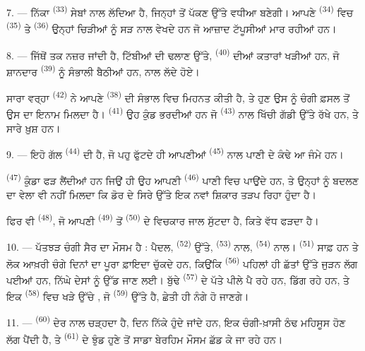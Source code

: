 7. --- ਨਿੱਕਾ  \textsuperscript{(33)} ਸੇਬਾਂ ਨਾਲ ਲੱਦਿਆ ਹੈ,
ਜਿਨ੍ਹਾਂ ਤੋਂ ਪੱਕਣ ਉੱਤੇ ਵਧੀਆ  ਬਣੇਗੀ। ਆਪਣੇ 
\textsuperscript{(34)} ਵਿਚ  \textsuperscript{(35)} ਤੇ
 \textsuperscript{(36)} ਉਨ੍ਹਾਂ ਚਿੜੀਆਂ ਨੂੰ ਸੜ ਨਾਲ ਵੇਖਦੇ ਹਨ ਜੋ
ਆਜ਼ਾਦ ਟੱਪੂਸੀਆਂ ਮਾਰ ਰਹੀਆਂ ਹਨ।

8. --- ਜਿੱਥੋਂ ਤਕ ਨਜ਼ਰ ਜਾਂਦੀ ਹੈ, ਟਿੱਬੀਆਂ ਦੀ ਢਲਾਣ ਉੱਤੇ, 
\textsuperscript{(40)} ਦੀਆਂ ਕਤਾਰਾਂ ਖੜੀਆਂ ਹਨ, ਜੋ ਸ਼ਾਨਦਾਰ 
\textsuperscript{(39)} ਨੂੰ ਸੰਭਾਲੀ ਬੈਠੀਆਂ ਹਨ,  ਨਾਲ ਲੱਦੇ ਹੋਏ।

ਸਾਰਾ ਵਰ੍ਹਾ  \textsuperscript{(42)} ਨੇ ਆਪਣੇ
 \textsuperscript{(38)} ਦੀ ਸੰਭਾਲ ਵਿਚ ਮਿਹਨਤ ਕੀਤੀ ਹੈ, ਤੇ ਹੁਣ
ਉਸ ਨੂੰ ਚੰਗੀ ਫ਼ਸਲ ਤੋਂ ਉਸ ਦਾ ਇਨਾਮ ਮਿਲਦਾ ਹੈ। 
\textsuperscript{(41)} ਉਹ ਕੁੰਡ ਭਰਦੀਆਂ ਹਨ ਜੋ  \textsuperscript{(43)}
ਨਾਲ ਖਿੱਚੀ ਗੱਡੀ ਉੱਤੇ ਰੱਖੇ ਹਨ, ਤੇ ਸਾਰੇ ਖ਼ੁਸ਼ ਹਨ।

\VUsaut{5.0mm}
\VUsaut{3.4mm}

9. --- ਇਹੋ ਗੱਲ  \textsuperscript{(44)} ਦੀ ਹੈ, ਜੋ ਪਹੁ ਫੁੱਟਦੇ ਹੀ
ਆਪਣੀਆਂ  \textsuperscript{(45)} ਨਾਲ ਪਾਣੀ ਦੇ ਕੰਢੇ ਆ ਜੰਮੇ ਹਨ।

 \textsuperscript{(47)} ਕੁੰਡਾ ਫੜ ਲੈਂਦੀਆਂ ਹਨ ਜਿਉਂ ਹੀ ਉਹ ਆਪਣੀ
 \textsuperscript{(46)} ਪਾਣੀ ਵਿਚ ਪਾਉਂਦੇ ਹਨ, ਤੇ ਉਨ੍ਹਾਂ ਨੂੰ
 ਬਦਲਣ ਦਾ ਵੇਲਾ ਵੀ ਨਹੀਂ ਮਿਲਦਾ ਕਿ ਡੋਰ ਦੇ ਸਿਰੇ ਉੱਤੇ ਇਕ ਨਵਾਂ ਸ਼ਿਕਾਰ ਤੜਪ
ਰਿਹਾ ਹੁੰਦਾ ਹੈ।

ਫਿਰ ਵੀ  \textsuperscript{(48)}, ਜੋ ਆਪਣੀ 
\textsuperscript{(49)} ਤੋਂ  \textsuperscript{(50)} ਦੇ ਵਿਚਕਾਰ ਜਾਲ ਸੁੱਟਦਾ
ਹੈ, ਕਿਤੇ ਵੱਧ ਫੜਦਾ ਹੈ।

10. --- ਪੱਤਝੜ ਚੰਗੀ ਸੈਰ ਦਾ ਮੌਸਮ ਹੈ : ਪੈਦਲ,  \textsuperscript{(52)}
ਉੱਤੇ,  \textsuperscript{(53)} ਨਾਲ,  \textsuperscript{(54)}
ਨਾਲ।  \textsuperscript{(51)} ਸਾਫ਼ ਹਨ ਤੇ ਲੋਕ ਆਖ਼ਰੀ ਚੰਗੇ ਦਿਨਾਂ ਦਾ ਪੂਰਾ
ਫ਼ਾਇਦਾ ਚੁੱਕਦੇ ਹਨ, ਕਿਉਂਕਿ  \textsuperscript{(56)} ਪਹਿਲਾਂ ਹੀ ਛੱਤਾਂ
ਉੱਤੇ ਜੁੜਨ ਲੱਗ ਪਈਆਂ ਹਨ, ਨਿੱਘੇ ਦੇਸਾਂ ਨੂੰ ਉੱਡ ਜਾਣ ਲਈ। ਬੁੱਢੇ 
\textsuperscript{(57)} ਦੇ ਪੱਤੇ ਪੀਲੇ ਪੈ ਰਹੇ ਹਨ,  ਡਿੱਗ ਰਹੇ ਹਨ, ਤੇ ਇਕ
 \textsuperscript{(58)} ਵਿਚ ਖੜੇ ਉੱਚੇ , ਜੋ
 \textsuperscript{(59)} ਉੱਤੇ ਹੈ, ਛੇਤੀ ਹੀ ਨੰਗੇ ਹੋ ਜਾਣਗੇ।

11. ---  \textsuperscript{(60)} ਦੇਰ ਨਾਲ ਚੜ੍ਹਦਾ ਹੈ, ਦਿਨ ਨਿੱਕੇ ਹੁੰਦੇ
ਜਾਂਦੇ ਹਨ,  ਇਕ ਚੰਗੀ-ਖ਼ਾਸੀ ਠੰਢ ਮਹਿਸੂਸ ਹੋਣ ਲੱਗ ਪੈਂਦੀ ਹੈ, ਤੇ
 \textsuperscript{(61)} ਦੇ ਝੁੰਡ ਹੁਣੇ ਤੋਂ ਸਾਡਾ ਬੇਰਹਿਮ ਮੌਸਮ ਛੱਡ ਕੇ ਜਾ
ਰਹੇ ਹਨ।
\VUsaut{6.0mm}
\VUfilet{22mm}
